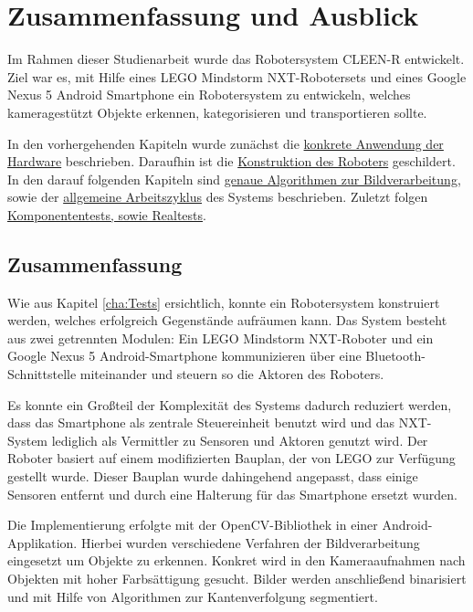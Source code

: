 \chapter{Zusammenfassung und Ausblick}
\label{cha:Fazit}

Im Rahmen dieser Studienarbeit wurde das Robotersystem CLEEN-R entwickelt. Ziel war es, mit Hilfe eines LEGO Mindstorm NXT-Robotersets und eines Google Nexus 5 Android Smartphone ein Robotersystem zu entwickeln, welches kameragestützt Objekte erkennen, kategorisieren und transportieren sollte. 

In den vorhergehenden Kapiteln wurde zunächst die \hyperref[cha:Materials]{konkrete Anwendung der Hardware}  beschrieben. Daraufhin ist die \hyperref[cha:robot]{Konstruktion des Roboters} geschildert. In den darauf folgenden Kapiteln sind \hyperref[cha:Software]{genaue Algorithmen zur Bildverarbeitung}, sowie der \hyperref[cha:Workloop]{allgemeine Arbeitszyklus} des Systems beschrieben. Zuletzt folgen \hyperref[cha:Tests]{Komponententests, sowie Realtests}.

\section{Zusammenfassung}

Wie aus Kapitel \ref{cha:Tests} ersichtlich, konnte ein Robotersystem konstruiert werden, welches erfolgreich Gegenstände aufräumen kann. Das System besteht aus zwei getrennten Modulen: Ein LEGO Mindstorm NXT-Roboter und ein Google Nexus 5 Android-Smartphone kommunizieren über eine Bluetooth-Schnittstelle miteinander und steuern so die Aktoren des Roboters. 

Es konnte ein Großteil der Komplexität des Systems dadurch reduziert werden, dass das Smartphone als zentrale Steuereinheit benutzt wird und das NXT-System lediglich als Vermittler zu Sensoren und Aktoren genutzt wird. Der Roboter basiert auf einem modifizierten Bauplan, der von LEGO zur Verfügung gestellt wurde. Dieser Bauplan wurde dahingehend angepasst, dass einige Sensoren entfernt und durch eine Halterung für das Smartphone ersetzt wurden.

Die Implementierung erfolgte mit der OpenCV-Bibliothek in einer Android-Applikation. Hierbei wurden verschiedene Verfahren der Bildverarbeitung eingesetzt um Objekte zu erkennen. Konkret wird in den Kameraaufnahmen nach Objekten mit hoher Farbsättigung gesucht. Bilder werden anschließend binarisiert und mit Hilfe von Algorithmen zur Kantenverfolgung segmentiert. 

